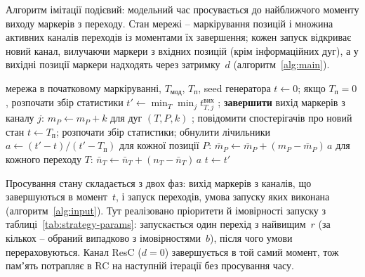Алгоритм імітації подієвий: модельний час просувається до найближчого моменту виходу маркерів
з переходу. Стан мережі -- маркірування позицій і множина активних каналів переходів із
моментами їх завершення; кожен запуск відкриває новий канал, вилучаючи маркери з вхідних позицій
(крім інформаційних дуг), а у вихідні позиції маркери надходять через затримку~$d$
(алгоритм~\ref{alg:main}).

\begin{algorithm}[tp]
  \caption{Імітація стохастичної мережі Петрі}\label{alg:main}
  \begin{algorithmic}[1]
    \Require мережа в початковому маркіруванні, $T_{\text{мод}}$, $T_{\text{п}}$, seed генератора
    \State $t \gets 0$; якщо $T_{\text{п}} = 0$, розпочати збір статистики
    \State {}
    \Loop
      \State $t' \gets \min_T \min_j t^{\text{вих}}_{T,j}$
        \State {}; \textbf{завершити}
      \EndIf
      \State {}
        \State вихід маркерів з каналу $j$: $m_P \gets m_P + k$ для дуг $(T, P, k)$
      \EndFor
      \State {}; повідомити спостерігачів про новий стан
    \EndLoop
    \Statex
        \State $t \gets T_{\text{п}}$; розпочати збір статистики; обнулити лічильники
      \EndIf
        \State $a \gets (t'-t)/(t'-T_{\text{п}})$
        \State для кожної позиції $P$: $\bar m_P \gets \bar m_P + (m_P-\bar m_P)\,a$
        \State для кожного переходу $T$: $\bar n_T \gets \bar n_T + (n_T-\bar n_T)\,a$
      \EndIf
      \State $t \gets t'$
    \EndProcedure
  \end{algorithmic}
\end{algorithm}

Просування стану складається з двох фаз: вихід маркерів з каналів, що завершуються в момент~$t$,
і запуск переходів, умова запуску яких виконана (алгоритм~\ref{alg:input}). Тут реалізовано
пріоритети й імовірності запуску з таблиці~\ref{tab:strategy-params}: запускається один перехід
з найвищим~$r$ (за кількох -- обраний випадково з імовірностями~$b$), після чого умови
перераховуються. Канал ResC ($d=0$) завершується в той самий момент, тож памʼять потрапляє в RC на
наступній ітерації без просування часу.


